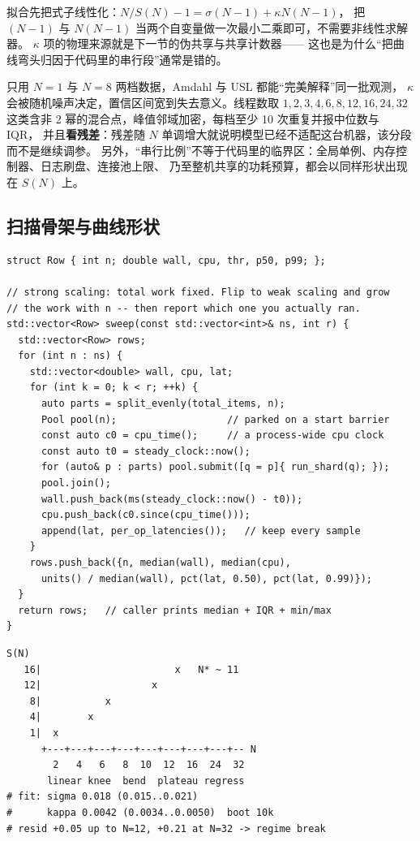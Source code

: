 \documentclass[12pt,a4paper,fontset=fandol]{ctexbook}
\newcommand{\Lang}[1]{\textsf{#1}}
\newcommand{\MWall}{\Lang{Wall}}
\newcommand{\MCpu}{\Lang{CPU}}
\newcommand{\MThr}{\Lang{Throughput}}
\newcommand{\Mx}[1]{\textsf{#1}}
\begin{document}
拟合先把式子线性化：$N / S(N) - 1 = \sigma (N - 1) + \kappa N (N - 1)$，
把 $(N-1)$ 与 $N(N-1)$ 当两个自变量做一次最小二乘即可，不需要非线性求解器。
$\kappa$ 项的物理来源就是下一节的伪共享与共享计数器——
这也是为什么``把曲线弯头归因于代码里的串行段''通常是错的。

\begin{warning}[title={两点定不出三个参数，也别把串行份额当成代码属性}]
只用 $N=1$ 与 $N=8$ 两档数据，Amdahl 与 USL 都能``完美解释''同一批观测，
$\kappa$ 会被随机噪声决定，置信区间宽到失去意义。线程数取 $1,2,3,4,6,8,12,16,24,32$
这类含非 2 幂的混合点，峰值邻域加密，每档至少 10 次重复并报中位数与 IQR，
并且\textbf{看残差}：残差随 $N$ 单调增大就说明模型已经不适配这台机器，该分段而不是继续调参。
另外，``串行比例''不等于代码里的临界区：全局单例、内存控制器、日志刷盘、连接池上限、
乃至整机共享的功耗预算，都会以同样形状出现在 $S(N)$ 上。
\end{warning}

\subsection{扫描骨架与曲线形状}

\begin{lstlisting}[style=cppstyle, label={lst:pm09-scan},
caption={线程数扫描骨架：每档打印 \MWall、\MCpu、\MThr{} 与 \Mx{p99}；数值列由读者填。}]
struct Row { int n; double wall, cpu, thr, p50, p99; };

// strong scaling: total work fixed. Flip to weak scaling and grow
// the work with n -- then report which one you actually ran.
std::vector<Row> sweep(const std::vector<int>& ns, int r) {
  std::vector<Row> rows;
  for (int n : ns) {
    std::vector<double> wall, cpu, lat;
    for (int k = 0; k < r; ++k) {
      auto parts = split_evenly(total_items, n);
      Pool pool(n);                   // parked on a start barrier
      const auto c0 = cpu_time();     // a process-wide cpu clock
      const auto t0 = steady_clock::now();
      for (auto& p : parts) pool.submit([q = p]{ run_shard(q); });
      pool.join();
      wall.push_back(ms(steady_clock::now() - t0));
      cpu.push_back(c0.since(cpu_time()));
      append(lat, per_op_latencies());   // keep every sample
    }
    rows.push_back({n, median(wall), median(cpu),
      units() / median(wall), pct(lat, 0.50), pct(lat, 0.99)});
  }
  return rows;   // caller prints median + IQR + min/max
}
\end{lstlisting}

\begin{lstlisting}[style=outstyle, label={lst:pm09-curve},
caption={同一二进制、每档 12 次重复的曲线与拟合片段：ASCII 形状与数值均为示意输出/格式示例（非本仓库实测值）。}]
 S(N)
   16|                       x   N* ~ 11
   12|                   x
    8|           x
    4|        x
    1|  x
      +---+---+---+---+---+---+---+---+-- N
        2   4   6   8  10  12  16  24  32
       linear knee  bend  plateau regress
# fit: sigma 0.018 (0.015..0.021)
#      kappa 0.0042 (0.0034..0.0050)  boot 10k
# resid +0.05 up to N=12, +0.21 at N=32 -> regime break
\end{lstlisting}
\end{document}
